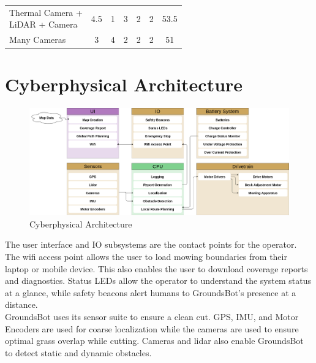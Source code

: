 \documentclass{article}
\begin{document}
\begin{table}[H]
\begin{adjustwidth}{0in}{0in}
\begin{tabular}{lcccccc}
		\makecell[l]{Thermal Camera + \\ LiDAR + Camera}             & 4.5     & 1    & 3                               & 2                               & 2                       & 53.5  \\ \hdashline
		Many Cameras                                                 & 3       & 4    & 2                               & 2                               & 2                       & 51    \\ 
		
		\end{tabular}

		\end{adjustwidth}
		\end{table}


\section{Cyberphysical Architecture}
\begin{figure}[H]
\includegraphics[scale=0.2]{cyberphysical.png}
\caption{Cyberphysical Architecture}
\label{fig:cyberphysical}
\end{figure}

  The user interface and IO subsystems are the contact points for the operator.  The wifi access point allows the user to load mowing boundaries from their laptop or mobile device.  This also enables the user to download coverage reports and diagnostics.  Status LEDs allow the operator to understand the system status at a glance, while safety beacons alert humans to GroundsBot's presence at a distance.\\

  GroundsBot uses its sensor suite to ensure a clean cut. GPS, IMU, and Motor Encoders are used for coarse localization while the cameras are used to ensure optimal grass overlap while cutting.  Cameras and lidar also enable GroundsBot to detect static and dynamic obstacles.\\
\end{document}
